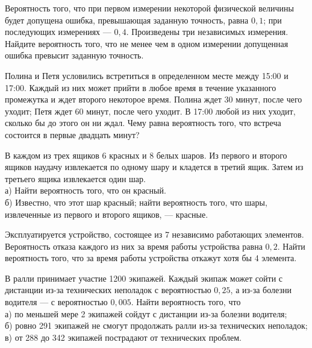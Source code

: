 \newpage\setcounter{zad}{0}



\begin{zkrW}{20}\noindent 
	Вероятность того, что при первом измерении некоторой физической величины будет допущена ошибка, превышающая заданную точность, равна $0{,}1$; при последующих измерениях --- $0{,}4$. Произведены три независимых измерения. Найдите вероятность того, что не менее чем в одном измерении допущенная ошибка превысит заданную точность.
 
\end{zkrW}

\begin{zkrW}{20}\noindent 
	Полина и Петя условились встретиться в определенном месте между 15:00 и 17:00. Каждый из них может прийти в любое время в течение указанного промежутка и ждет второго некоторое время. Полина ждет 30 минут, после чего уходит; Петя ждет 60 минут, после чего уходит. В 17:00 любой из них уходит, сколько бы до этого он ни ждал. Чему равна вероятность того, что встреча состоится в первые двадцать минут?
 
\end{zkrW}

\begin{zkrW}{20}\noindent 
	В каждом из трех ящиков 6 красных и 8 белых шаров. Из первого и второго ящиков наудачу извлекается по одному шару и кладется в третий ящик. Затем из третьего ящика извлекается один шар. \\ \indent а) Найти вероятность того, что он красный. \\ \indent б) Известно, что этот шар красный; найти вероятность того, что шары, извлеченные из первого и второго ящиков, --- красные.
 
\end{zkrW}

\begin{zkrW}{20}\noindent 
	Эксплуатируется устройство, состоящее из 7 независимо работающих элементов. Вероятность отказа каждого из них за время работы устройства равна $0{,}2$. Найти вероятность того, что за время работы устройства откажут хотя бы 4 элемента.
 
\end{zkrW}

\begin{zkrW}{20}\noindent 
	В ралли принимает участие 1200 экипажей. Каждый экипаж может сойти с дистанции из-за технических неполадок с вероятностью $0{,}25$, а из-за болезни водителя --- с вероятностью $0{,}005$. Найти вероятность того, что \\ \indent а) по меньшей мере 2 экипажей сойдут с дистанции из-за болезни водителя; \\ \indent б) ровно 291 экипажей не смогут продолжать ралли из-за технических неполадок; \\ \indent в) от 288 до 342 экипажей пострадают от технических проблем.
 
\end{zkrW}

